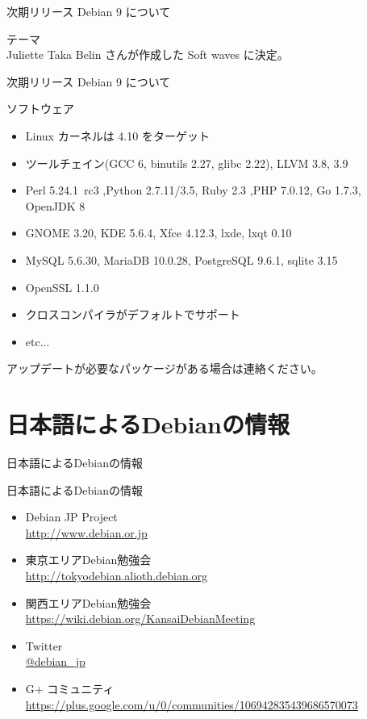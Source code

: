 \begin{frame}{次期リリース Debian 9 について}%

テーマ\\
Juliette Taka Belin さんが作成した Soft waves に決定。
 \begin{center}
 \end{center}

\end{frame}

\begin{frame}{次期リリース Debian 9 について}%

ソフトウェア
\begin{itemize}
\item Linux カーネルは 4.10 をターゲット
\item ツールチェイン(GCC 6, binutils 2.27, glibc 2.22), LLVM 3.8, 3.9
\item Perl 5.24.1~rc3 ,Python 2.7.11/3.5, Ruby 2.3 ,PHP 7.0.12, Go 1.7.3, OpenJDK 8
\item GNOME 3.20, KDE 5.6.4, Xfce 4.12.3, lxde, lxqt 0.10
\item MySQL 5.6.30, MariaDB 10.0.28, PostgreSQL 9.6.1, sqlite 3.15
\item OpenSSL 1.1.0
\item クロスコンパイラがデフォルトでサポート
\item etc...
\end{itemize}

アップデートが必要なパッケージがある場合は連絡ください。

\end{frame}

\section{日本語によるDebianの情報}
\begin{frame}\begin{center}\Huge{日本語によるDebianの情報}\end{center}\end{frame}

\begin{frame}{日本語によるDebianの情報}
\begin{itemize}
  \item Debian JP Project \\
      \url{http://www.debian.or.jp}
  \item 東京エリアDebian勉強会\\
      \url{http://tokyodebian.alioth.debian.org}
  \item 関西エリアDebian勉強会 \\
      \url{https://wiki.debian.org/KansaiDebianMeeting}
  \item Twitter \\
      \url{@debian_jp}
  \item G+ コミュニティ \\
      \url{https://plus.google.com/u/0/communities/106942835439686570073}
 
\end{itemize}
\end{frame}

